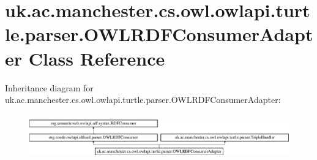 \hypertarget{classuk_1_1ac_1_1manchester_1_1cs_1_1owl_1_1owlapi_1_1turtle_1_1parser_1_1_o_w_l_r_d_f_consumer_adapter}{\section{uk.\-ac.\-manchester.\-cs.\-owl.\-owlapi.\-turtle.\-parser.\-O\-W\-L\-R\-D\-F\-Consumer\-Adapter Class Reference}
\label{classuk_1_1ac_1_1manchester_1_1cs_1_1owl_1_1owlapi_1_1turtle_1_1parser_1_1_o_w_l_r_d_f_consumer_adapter}
}
Inheritance diagram for uk.\-ac.\-manchester.\-cs.\-owl.\-owlapi.\-turtle.\-parser.\-O\-W\-L\-R\-D\-F\-Consumer\-Adapter\-:\begin{figure}[H]
\begin{center}
\leavevmode
\includegraphics[height=1.944444cm]{classuk_1_1ac_1_1manchester_1_1cs_1_1owl_1_1owlapi_1_1turtle_1_1parser_1_1_o_w_l_r_d_f_consumer_adapter}
\end{center}
\end{figure}
